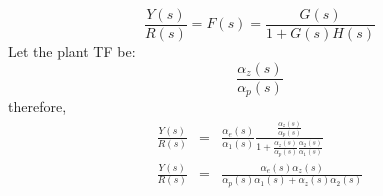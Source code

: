 \[
\frac{Y(s)}{R(s)}=F(s)=\frac{G(s)}{1+G(s)H(s)}
\]
Let the plant TF be:
\[
\frac{\alpha_z(s)}{\alpha_p(s)}
\]
therefore,
\begin{eqnarray*}
	\frac{Y(s)}{R(s)} &=& \frac{\alpha_e(s)}{\alpha_1(s)}\frac{\frac{\alpha_z(s)}{\alpha_p(s)}}{1+\frac{\alpha_z(s)}{\alpha_p(s)}\frac{\alpha_2(s)}{\alpha_1(s)}} \\
	\frac{Y(s)}{R(s)} &=& \frac{\alpha_e(s)\alpha_z(s)}{\alpha_p(s)\alpha_1(s)+\alpha_z(s)\alpha_2(s)}
\end{eqnarray*}




\endinput


